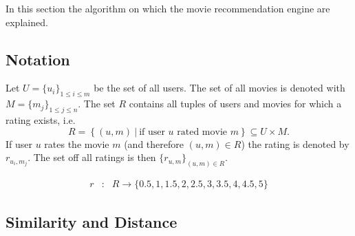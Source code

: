 \documentclass{article}
\begin{document}
In this section the algorithm on which the movie recommendation engine are explained.

\subsection{Notation}

Let $U = \{ u_i \}_{1 \leq i \leq m}$ be the set of all users. The set of all movies is denoted with $M = \{ m_j \}_{1 \leq j \leq n}$. The set $R$ contains all tuples of users and movies for which a rating exists, i.e.
\[ R = \left\{ (u, m)~|~\textrm{if user }u\textrm{ rated movie }m\right\}\subseteq U\times M.\]
If user $u$ rates the movie $m$ (and therefore $(u,m)\in R$)  the rating is denoted by $r_{u_i, m_j}$. The set off all ratings is then $\{ r_{u, m}\}_{(u,m)\in R}$.

\begin{eqnarray}
r &:& R \rightarrow \{0.5, 1, 1.5, 2, 2.5, 3, 3.5, 4, 4.5, 5\}\nonumber
\end{eqnarray}


\subsection{Similarity and Distance}
\end{document}
